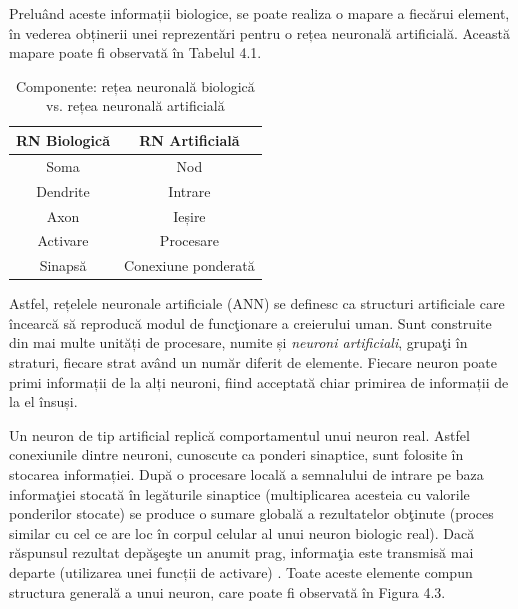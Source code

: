 \documentclass[a4paper,12pt]{report}
\begin{document}
Preluând aceste informații biologice, se poate realiza o mapare a fiecărui element,
în vederea obținerii unei reprezentări pentru o rețea neuronală artificială. Această 
mapare poate fi observată în Tabelul 4.1.
\begin{table}[h!]
    \begin{center}
        \begin{tabular}{ | c | c | }
            \hline 
                RN Biologică  &  RN Artificială  \\
                \hline \hline 
                Soma  &  Nod  \\
                \hline
                Dendrite  &  Intrare  \\
                \hline
                Axon  &  Ieșire  \\
                \hline
                Activare  &  Procesare  \\
                \hline
                Sinapsă  &  Conexiune ponderată  \\
            \hline
        \end{tabular}
        \caption{Componente: rețea neuronală biologică vs. rețea neuronală artificială}
    \end{center}
\end{table}


Astfel, rețelele neuronale artificiale (ANN) se definesc ca structuri artificiale care
încearcă să reproducă modul de funcţionare a creierului uman. Sunt construite
din mai multe unități de procesare, numite și \emph{neuroni artificiali}, grupaţi în
straturi, fiecare strat având un număr diferit de elemente. 
Fiecare neuron poate primi informații de la alți neuroni, fiind acceptată 
chiar primirea de informații de la el însuși.  

Un neuron de tip artificial replică comportamentul unui neuron real. Astfel 
conexiunile dintre neuroni, cunoscute ca ponderi sinaptice, sunt folosite în
stocarea informației. După o procesare locală a semnalului de intrare pe baza 
informaţiei stocată în legăturile sinaptice (multiplicarea acesteia cu
valorile ponderilor stocate) se produce o sumare globală a
rezultatelor obţinute (proces similar cu cel ce are loc în corpul celular al
unui neuron biologic real). Dacă răspunsul rezultat depăşeşte un
anumit prag, informaţia este transmisă mai departe (utilizarea 
unei funcții de activare) \cite{Tehnici-de-inteligență-computațională-Aplicații-în-electronică-și-biomedicină}. 
Toate aceste elemente compun structura generală a unui neuron, care poate 
fi observată în Figura 4.3.
\end{document}
